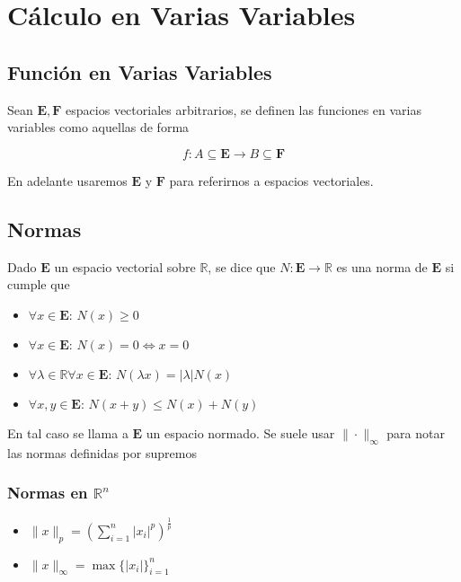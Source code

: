 \section{Cálculo en Varias Variables}

\subsection{Función en Varias Variables}

Sean $\mathbf{E}, \mathbf{F}$ espacios vectoriales arbitrarios, se definen las funciones en varias variables como aquellas de forma

\[f: A\subseteq\mathbf{E}\to B\subseteq\mathbf{F}\]

En adelante usaremos $\mathbf{E}$ y $\mathbf{F}$ para referirnos a espacios vectoriales.

\subsection{Normas}

Dado $\mathbf{E}$ un espacio vectorial sobre $\mathbb{R}$, se dice que $N:\mathbf{E}\to\mathbb{R}$ es una norma de $\mathbf{E}$ si cumple que

\begin{itemize}
    \item $\forall x\in\mathbf{E}:\, N(x)\geq 0$
    \item $\forall x\in\mathbf{E}:\, N(x)=0\Leftrightarrow
    x=0$
    \item $\forall\lambda\in\mathbb{R}\forall x\in\mathbf{E}:\,
    N(\lambda x) = |\lambda | N(x)$
    \item $\forall x,y\in\mathbf{E}:\, N(x+y)\leq N(x)+N(y)$
\end{itemize}

En tal caso se llama a $\mathbf{E}$ un espacio normado. Se suele usar $\|\cdot\|_\infty$ para notar las normas definidas por supremos

\subsubsection{Normas en $\mathbb{R}^n$}

\begin{itemize}
    \item $\|x\|_p=\left(\sum^n_{i=1}|x_i|^p\right)^{\frac{1}{p}}$
    \item $\|x\|_\infty = \max\{|x_i|\}^n_{i=1}$
\end{itemize}

